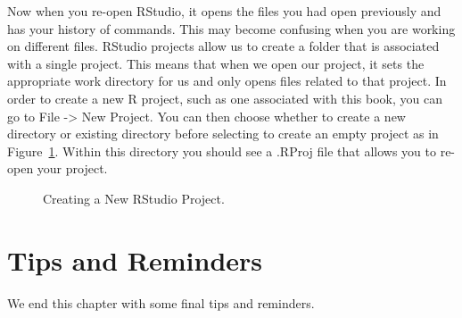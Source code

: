 \documentclass[
  letterpaper,
]{latex/krantz}
\begin{document}
Now when you re-open RStudio, it opens the files you had open previously
and has your history of commands. This may become confusing when you are
working on different files. RStudio projects allow us to create a folder
that is associated with a single project. This means that when we open
our project, it sets the appropriate work directory for us and only
opens files related to that project. In order to create a new R
project, such as one associated with this book,
you can go to File -\textgreater{} New Project. You can then choose
whether to create a new directory or existing directory before selecting
to create an empty project as in Figure~\ref{fig-new-project}. Within
this directory you should see a .RProj file that allows you to re-open
your project.

\begin{figure}


\caption{\label{fig-new-project}Creating a New RStudio Project.}

\end{figure}%

\section{Tips and Reminders}\label{tips-and-reminders}

We end this chapter with some final tips and reminders.
\end{document}
